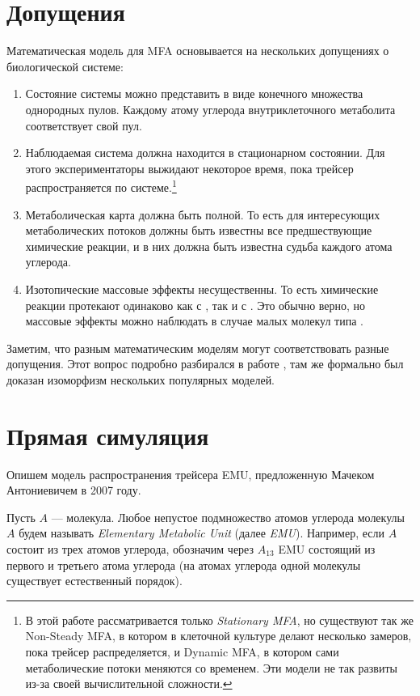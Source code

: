 \documentclass[a4paper, 12pt, left=30mm, right=15mm, top=20mm, bottom=20mm]{report}
\begin{document}
\section{Допущения}
Математическая модель для MFA основывается на нескольких допущениях о биологической системе\cite{Wiechert_1997_1}:
\begin{enumerate}
	\item Состояние системы можно представить в виде конечного множества однородных пулов. Каждому атому углерода внутриклеточного метаболита соответствует свой пул.
	
	\item Наблюдаемая система должна находится в стационарном состоянии. Для этого экспериментаторы выжидают некоторое время, пока трейсер распространяется по системе.\footnote{В этой работе рассматривается только \emph{Stationary MFA}, но существуют так же Non-Steady MFA\cite{NMFA}, в котором в клеточной культуре делают несколько замеров, пока трейсер распределяется, и Dynamic MFA\cite{DMFA}, в котором сами метаболические потоки меняются со временем. Эти модели не так развиты из-за своей вычислительной сложности.}
	
	\item Метаболическая карта должна быть полной. То есть для интересующих метаболических потоков должны быть известны все предшествующие химические реакции, и в них должна быть известна судьба каждого атома углерода.
	
	\item Изотопические массовые эффекты несущественны. То есть химические реакции протекают одинаково как с , так и с . Это обычно верно, но массовые эффекты можно наблюдать в случае малых молекул типа .
\end{enumerate}

Заметим, что разным математическим моделям могут соответствовать разные допущения. Этот вопрос подробно разбирался в работе \cite{formalizm_2017}, там же формально был доказан изоморфизм нескольких популярных моделей.
\clearpage

\section{Прямая симуляция}
Опишем модель распространения трейсера EMU, предложенную Мачеком Антониевичем в 2007 году\cite{EMU_2007}.

Пусть $A$ --- молекула. Любое непустое подмножество атомов углерода молекулы $A$ будем называть \emph{Elementary Metabolic Unit} (далее \emph{EMU}). Например, если $A$ состоит из трех атомов углерода, обозначим через $A_{13}$ EMU состоящий из первого и третьего атома углерода (на атомах углерода одной молекулы существует естественный порядок).
\end{document}

